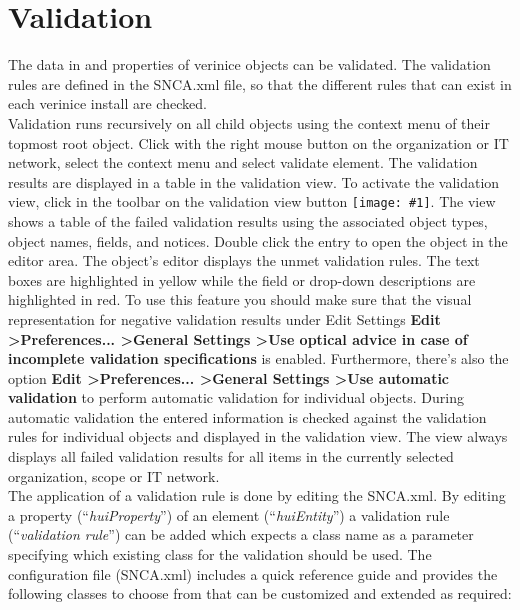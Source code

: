 \documentclass[a4paper,10pt]{book}
\newcommand{\icon}[1]{\texttt{[image: \#1]}}
\begin{document}
\section{Validation}
The data in and properties of verinice objects can be validated. The validation rules are defined in the SNCA.xml file, so that the different rules that can exist in each verinice install are checked.
\\
Validation runs recursively on all child objects using the context menu of their topmost root object. Click with the right mouse button on the organization or IT network, select the context menu and select validate element.
The validation results are displayed in a table in the validation view.
To activate the validation view, click in the toolbar on the validation view button \icon{Icon/quickfix_warning_obj.png}. The view shows a table of the failed validation results using the associated object types, object names, fields, and notices. Double click the entry to open the object in the editor area. The object's editor displays the unmet validation rules. The text boxes are highlighted in yellow while the field or drop-down descriptions are highlighted in red. To use this feature you should make sure that the visual representation for negative validation results under Edit Settings \textbf{Edit \textgreater Preferences... \textgreater General Settings \textgreater Use optical advice in case of incomplete validation specifications} is enabled.
Furthermore, there's also the option \textbf{Edit
\textgreater Preferences... \textgreater General Settings \textgreater Use automatic validation} to perform automatic validation for individual objects.
During automatic validation the entered information is checked against the validation rules for individual objects and displayed in the validation view.
The view always displays all failed validation results for all items in the currently selected organization, scope or IT network.
\newline\\
The application of a validation rule is done by editing the SNCA.xml.
By editing a property (``\textit{huiProperty}'') of an element (``\textit{huiEntity}'')
a validation rule (``\textit{validation rule}'') can be added which expects a class name as a parameter specifying which existing class for the validation should be used. The configuration file (SNCA.xml) includes a quick reference guide and provides the following classes to choose from that can be customized and extended as required:
\newline\\
\end{document}
